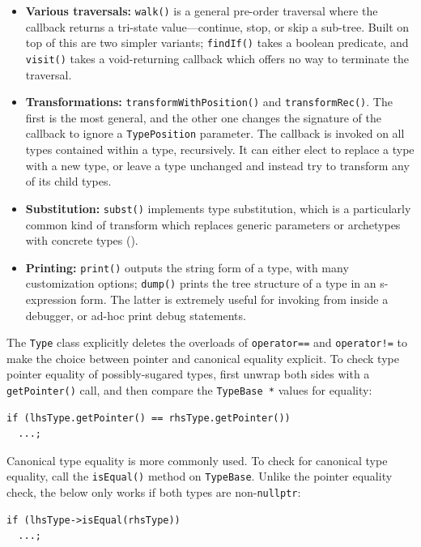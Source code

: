 \documentclass[../generics]{subfiles}
\begin{document}
\begin{itemize}
\item \textbf{Various traversals:} \texttt{walk()} is a general pre-order traversal where the callback returns a tri-state value---continue, stop, or skip a sub-tree. Built on top of this are two simpler variants; \texttt{findIf()} takes a boolean predicate, and \texttt{visit()} takes a void-returning callback which offers no way to terminate the traversal.
\item \textbf{Transformations:} \texttt{transformWithPosition()} and \texttt{transformRec()}. The first is the most general, and the other one changes the signature of the callback to ignore a \texttt{TypePosition} parameter. The callback is invoked on all types contained within a type, recursively. It can either elect to replace a type with a new type, or leave a type unchanged and instead try to transform any of its child types.
\item \textbf{Substitution:} \texttt{subst()} implements type substitution, which is a particularly common kind of transform which replaces generic parameters or archetypes with concrete types ().
\item \textbf{Printing:} \texttt{print()} outputs the string form of a type, with many customization options; \texttt{dump()} prints the tree structure of a type in an s-expression form. The latter is extremely useful for invoking from inside a debugger, or ad-hoc print debug statements.
\end{itemize}
The \texttt{Type} class explicitly deletes the overloads of \texttt{operator==} and \texttt{operator!=} to make the choice between pointer and canonical equality explicit. To check type pointer equality of possibly-sugared types, first unwrap both sides with a \texttt{getPointer()} call, and then compare the \texttt{TypeBase *} values for equality:
\begin{Verbatim}
if (lhsType.getPointer() == rhsType.getPointer())
  ...;
\end{Verbatim}
Canonical type equality is more commonly used. To check for canonical type equality, call the \texttt{isEqual()} method on \texttt{TypeBase}. Unlike the pointer equality check, the below only works if both types are non-\texttt{nullptr}:
\begin{Verbatim}
if (lhsType->isEqual(rhsType))
  ...;
\end{Verbatim}
\end{document}
